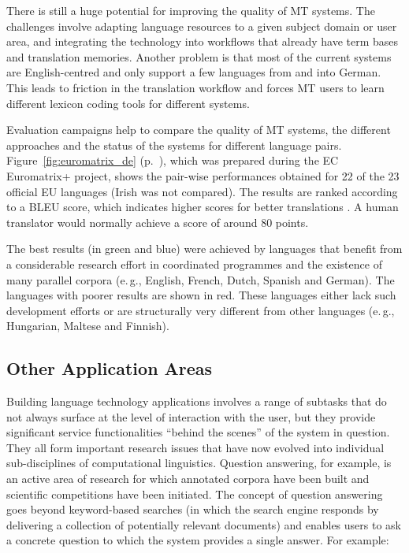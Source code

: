 \documentclass[]{../../metanetpaper}
\begin{document}
\begin{multicols}{2}
There is still a huge potential for improving the quality of MT systems. The challenges involve adapting language resources to a given subject domain or user area, and integrating the technology into workflows that already have term bases and translation memories. Another problem is that most of the current systems are English-centred and only support a few languages from and into German. This leads to friction in the translation workflow and forces MT users to learn different lexicon coding tools for different systems.

Evaluation campaigns help to compare the quality of MT systems, the different approaches and the status of the systems for different language pairs. Figure~\ref{fig:euromatrix_de} (p.~\pageref{fig:euromatrix_de}), which was prepared during the EC Euromatrix+ project, shows the pair-wise performances obtained for 22 of the 23 official EU languages (Irish was not compared). The results are ranked according to a BLEU score, which indicates higher scores for better translations \cite{bleu1}. A human translator would normally achieve a score of around 80 points.

The best results (in green and blue) were achieved by languages that benefit from a considerable research effort in coordinated programmes and the existence of many parallel corpora (e.\,g., English, French, Dutch, Spanish and German). The languages with poorer results are shown in red. These languages either lack such development efforts or are structurally very different from other languages (e.\,g., Hungarian, Maltese and Finnish).

\subsection{Other Application Areas}

Building language technology applications involves a range of subtasks that do not always surface at the level of interaction with the user, but they provide significant service functionalities “behind the scenes” of the system in question. They all form important research issues that have now evolved into individual sub-disciplines of computational linguistics.  Question answering, for example, is an active area of research for which annotated corpora have been built and scientific competitions have been initiated. The concept of question answering goes beyond keyword-based searches (in which the search engine responds by delivering a collection of potentially relevant documents) and enables users to ask a concrete question to which the system provides a single answer. For example:


\end{multicols}
\end{document}
